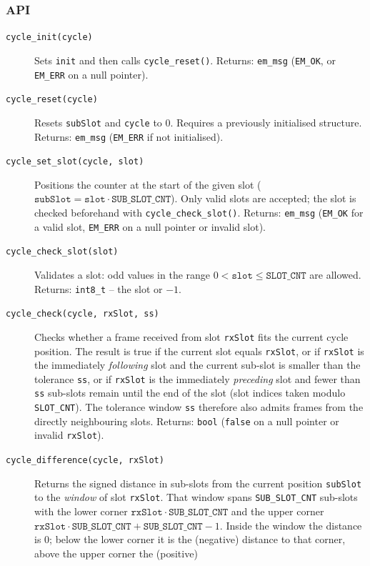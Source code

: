 \subsubsection*{API}
\begin{description}
\item[\texttt{cycle\_init(cycle)}] Sets \verb|init| and then calls
  \verb|cycle_reset()|. Returns: \verb|em_msg| (\verb|EM_OK|, or \verb|EM_ERR|
  on a null pointer).
\item[\texttt{cycle\_reset(cycle)}] Resets \verb|subSlot| and \verb|cycle| to
  $0$. Requires a previously initialised structure. Returns: \verb|em_msg|
  (\verb|EM_ERR| if not initialised).
\item[\texttt{cycle\_set\_slot(cycle, slot)}] Positions the counter at the
  start of the given slot ($\mathtt{subSlot} = \mathtt{slot} \cdot
  \mathtt{SUB\_SLOT\_CNT}$). Only valid slots are accepted; the slot is checked
  beforehand with \verb|cycle_check_slot()|. Returns: \verb|em_msg|
  (\verb|EM_OK| for a valid slot, \verb|EM_ERR| on a null pointer or invalid
  slot).
\item[\texttt{cycle\_check\_slot(slot)}] Validates a slot: odd values in the
  range $0 < \mathtt{slot} \le \mathtt{SLOT\_CNT}$ are allowed. Returns:
  \verb|int8_t| -- the slot or $-1$.
\item[\texttt{cycle\_check(cycle, rxSlot, ss)}] Checks whether a frame received
  from slot \verb|rxSlot| fits the current cycle position. The result is true
  if the current slot equals \verb|rxSlot|, or if \verb|rxSlot| is the
  immediately \emph{following} slot and the current sub-slot is smaller than
  the tolerance \verb|ss|, or if \verb|rxSlot| is the immediately
  \emph{preceding} slot and fewer than \verb|ss| sub-slots remain until the end
  of the slot (slot indices taken modulo \verb|SLOT_CNT|). The tolerance window
  \verb|ss| therefore also admits frames from the directly neighbouring slots.
  Returns: \verb|bool| (\verb|false| on a null pointer or invalid
  \verb|rxSlot|).
\item[\texttt{cycle\_difference(cycle, rxSlot)}] Returns the signed distance in
  sub-slots from the current position \verb|subSlot| to the \emph{window} of
  slot \verb|rxSlot|. That window spans \verb|SUB_SLOT_CNT| sub-slots with the
  lower corner $\mathtt{rxSlot} \cdot \mathtt{SUB\_SLOT\_CNT}$ and the upper
  corner $\mathtt{rxSlot} \cdot \mathtt{SUB\_SLOT\_CNT} + \mathtt{SUB\_SLOT\_CNT} - 1$.
  Inside the window the distance is $0$; below the lower corner it is the
  (negative) distance to that corner, above the upper corner the (positive)

\end{description}
